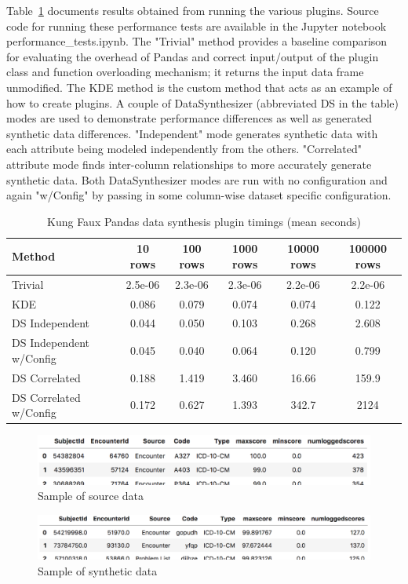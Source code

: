 \documentclass{amia}
\begin{document}
Table~\ref{timing_results} documents results obtained from running the various plugins. Source code for running these performance tests are available in the Jupyter notebook performance\_tests.ipynb. The "Trivial" method provides a baseline comparison for evaluating the overhead of Pandas and correct input/output of the plugin class and function overloading mechanism; it returns the input data frame unmodified. The KDE method is the custom method that acts as an example of how to create plugins. A couple of DataSynthesizer (abbreviated DS in the table) modes are used to demonstrate performance differences as well as generated synthetic data differences. "Independent" mode generates synthetic data with each attribute being modeled independently from the others. "Correlated" attribute mode finds inter-column relationships to more accurately generate synthetic data. Both DataSynthesizer modes are run with no configuration and again "w/Config" by passing in some column-wise dataset specific configuration.

\begin{table}
	\caption{Kung Faux Pandas data synthesis plugin timings (mean seconds)}
	\label{timing_results}
	\centering
	\begin{tabular}{l c c c c c}
		\toprule 
		Method & 10 rows & 100 rows & 1000 rows & 10000 rows & 100000 rows\\ 
		\midrule 
		Trivial & 2.5e-06 & 2.3e-06 & 2.3e-06 & 2.2e-06 & 2.2e-06 \\ 
		KDE & 0.086 & 0.079 & 0.074 & 0.074 & 0.122 \\ 
		DS Independent & 0.044 & 0.050 & 0.103 & 0.268 & 2.608 \\ 
		DS Independent w/Config & 0.045 & 0.040 & 0.064 & 0.120 & 0.799 \\
		DS Correlated & 0.188 & 1.419 & 3.460 & 16.66 & 159.9 \\ 
		DS Correlated w/Config & 0.172 & 0.627 & 1.393 & 342.7 & 2124 \\ 
		\midrule
	\end{tabular}
\end{table}

\begin{figure}[ht]
  \centering
  \includegraphics[width=120mm]{sample_source_data}
  \caption{Sample of source data}
  \label{fig:sample_source_data}
\end{figure}
\begin{figure}[ht]
  \centering
  \includegraphics[width=120mm]{sample_synthetic_data}
  \caption{Sample of synthetic data}
  \label{fig:sample_synthetic_data}
\end{figure}
\end{document}
